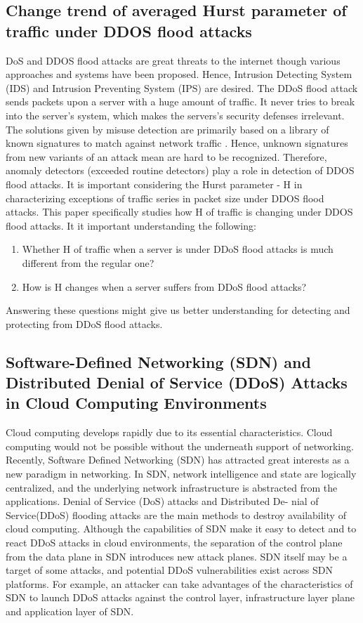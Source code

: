 \documentclass{report}
\begin{document}
\subsection {Change trend of averaged Hurst parameter of traffic under DDOS flood attacks}
DoS and DDOS flood attacks are great threats to the internet though various approaches and systems have been proposed. Hence, Intrusion Detecting System (IDS) and Intrusion Preventing System (IPS) are desired. The DDoS flood attack sends packets upon a server with a huge amount of traffic. It never tries to break into the server’s system, which makes the servers’s security defenses irrelevant.
\hfill \break
The solutions given by misuse detection are primarily based on a library of known signatures to match against network traffic . Hence, unknown signatures from new variants of an attack mean are hard to be recognized. Therefore, anomaly detectors (exceeded routine detectors) play a role in detection of DDOS flood attacks.
\hfill \break
It is important considering the Hurst parameter - H in characterizing exceptions of traffic series in packet size under DDOS flood attacks. This paper specifically  \cite{Hurst} studies how H of traffic is changing under DDOS flood attacks. It it important understanding the following:
\begin{enumerate}
\item Whether H of traffic when a server is under DDoS flood attacks is much different from the regular one?
\item How is H changes when a server suffers from DDoS flood attacks?
\end{enumerate}
Answering these questions might give us better understanding for detecting and protecting from DDoS flood attacks.
\hfill \break

\subsection{Software-Defined Networking (SDN) and Distributed Denial of Service (DDoS) Attacks in Cloud Computing Environments }
Cloud computing develops rapidly due to its essential characteristics. Cloud computing would not be possible without the underneath support of networking. Recently, Software Defined Networking (SDN)  \cite{SDN} has attracted great interests as a new paradigm in networking. In SDN, network intelligence and state are logically centralized, and the underlying network infrastructure is abstracted from the applications. Denial of Service (DoS) attacks and Distributed De-
nial of Service(DDoS) flooding attacks are the main methods to destroy availability of cloud computing.
Although the capabilities of SDN make it easy to detect and to react DDoS attacks in cloud environments, the separation of the control plane from the data plane in SDN introduces new attack planes. SDN itself may be a target of some attacks, and potential DDoS vulnerabilities exist across SDN platforms. For example, an attacker can take advantages of the characteristics of SDN to launch DDoS attacks against the control layer, infrastructure layer plane and application layer of SDN.
 \hfill \break
\end{document}
